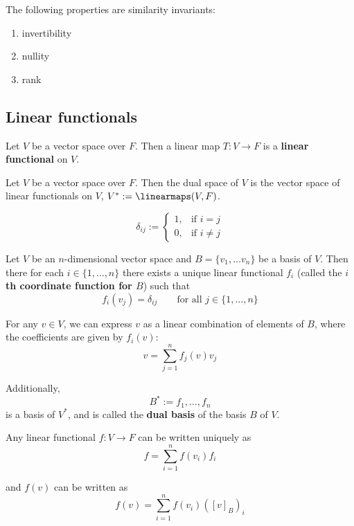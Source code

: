 \begin{theorem}
  The following properties are similarity invariants:
  \begin{enumerate}
    \item invertibility
    \item nullity
    \item rank
  \end{enumerate}
\end{theorem}

\subsection{Linear functionals}

\begin{definition}
  Let $V$ be a vector space over $F$. Then a linear map $T : V \to F$ is a \textbf{linear functional} on $V$.
\end{definition}

\begin{definition}
  Let $V$ be a vector space over $F$. Then the dual space of $V$ is the vector space of linear functionals on $V$, $V^* := \linearmaps(V, F)$.
\end{definition}

\begin{definition}
  \[
    \delta_{ij} := \begin{cases}
      1, & \text{if $i = j$} \\
      0, & \text{if $i \neq j$}
    \end{cases}
  \]
\end{definition}

\begin{definition}
\end{definition}
\begin{definition}
\end{definition}
\begin{lemma}
  Let $V$ be an $n$-dimensional vector space and $B = \{v_1, \ldots v_n\}$ be a basis of $V$. Then there for each $i \in \{1, \ldots, n\}$ there exists a unique linear functional $f_i$ (called the \textbf{$i$th coordinate function for $B$}) such that
  \[
    f_i(v_j) = \delta_{ij} \qquad \text{for all $j \in \{1, \ldots, n\}$}
  \]

  For any $v \in V$, we can express $v$ as a linear combination of elements of $B$, where the coefficients are given by $f_i(v)$:
  \[
    v = \sum_{j = 1}^n f_j(v) v_j
  \]

  Additionally, 
  \[
    B^* := {f_1, \ldots, f_n}
  \]
  is a basis of $V^*$, and is called the \textbf{dual basis} of the basis $B$ of $V$.

  Any linear functional $f : V \to F$ can be written uniquely as
  \[
    f = \sum_{i = 1}^n f(v_i) f_i
  \]

  and $f(v)$ can be written as
  \[
    f(v) = \sum_{i = 1}^n f(v_i) ([v]_B)_i
  \]
\end{lemma}

